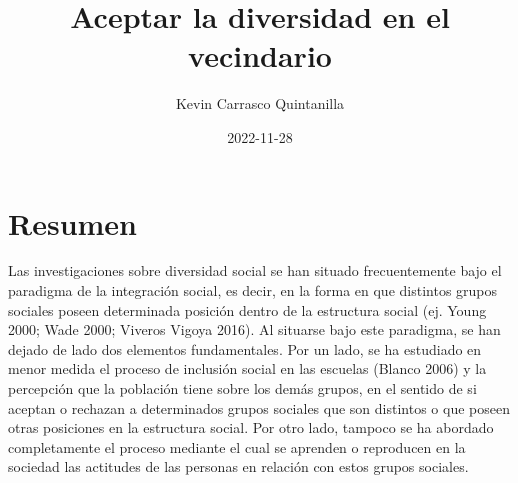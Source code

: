\documentclass[12pt,twoside]{templates/facsothesis}
\title{Aceptar la diversidad en el vecindario}
\author{Kevin Carrasco Quintanilla}
\date{2022-11-28}
\begin{document}

  \maketitle

\frontmatter %
\pagestyle{empty} %



  \setcounter{tocdepth}{1}
  \setlength{\parskip}{0pt}
  \tableofcontents

\setlength\parskip{1em plus 0.1em minus 0.2em}

  \listoftables

  \listoffigures



\mainmatter %
\pagestyle{fancyplain} %

\hypertarget{resumen}{%
\chapter{Resumen}\label{resumen}}

Las investigaciones sobre diversidad social se han situado frecuentemente bajo el paradigma de la integración social, es decir, en la forma en que distintos grupos sociales poseen determinada posición dentro de la estructura social (ej. Young 2000; Wade 2000; Viveros Vigoya 2016). Al situarse bajo este paradigma, se han dejado de lado dos elementos fundamentales. Por un lado, se ha estudiado en menor medida el proceso de inclusión social en las escuelas (Blanco 2006) y la percepción que la población tiene sobre los demás grupos, en el sentido de si aceptan o rechazan a determinados grupos sociales que son distintos o que poseen otras posiciones en la estructura social. Por otro lado, tampoco se ha abordado completamente el proceso mediante el cual se aprenden o reproducen en la sociedad las actitudes de las personas en relación con estos grupos sociales.
\end{document}

